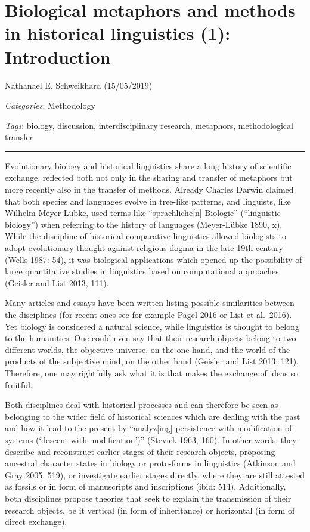 \documentclass[
  a4paper,
  14pt,
  oneside,
  tablecaptionabove
]{scrbook}
\begin{document}
\newpage
\section*{Biological metaphors and methods in
historical linguistics (1): Introduction}

Nathanael E. Schweikhard (15/05/2019)

\emph{Categories}: Methodology

\emph{Tags}: biology, discussion, interdisciplinary research, metaphors,
methodological transfer

\begin{center}\rule{0.5\linewidth}{1pt}\end{center}

Evolutionary biology and historical linguistics share a long history of
scientific exchange, reflected both not only in the sharing and transfer
of metaphors but more recently also in the transfer of methods. Already
Charles Darwin claimed that both species and languages evolve in
tree-like patterns, and linguists, like Wilhelm Meyer-Lübke, used terms
like \enquote{sprachliche{[}n{]} Biologie} (\enquote{linguistic
biology}) when referring to the history of languages (Meyer-Lübke 1890,
x). While the discipline of historical-comparative linguistics allowed
biologists to adopt evolutionary thought against religious dogma in the
late 19th century (Wells 1987: 54), it was biological applications which
opened up the possibility of large quantitative studies in linguistics
based on computational approaches (Geisler and List 2013, 111).

Many articles and essays have been written listing possible similarities
between the disciplines (for recent ones see for example Pagel 2016 or
List et al.~2016). Yet biology is considered a natural science, while
linguistics is thought to belong to the humanities. One could even say
that their research objects belong to two different worlds, the
objective universe, on the one hand, and the world of the products of
the subjective mind, on the other hand (Geisler and List 2013: 121).
Therefore, one may rightfully ask what it is that makes the exchange of
ideas so fruitful.

Both disciplines deal with historical processes and can therefore be
seen as belonging to the wider field of historical sciences which are
dealing with the past and how it lead to the present by
\enquote{analyz{[}ing{]} persistence with modification of systems
(\enquote{descent with modification})} (Stevick 1963, 160). In other
words, they describe and reconstruct earlier stages of their research
objects, proposing ancestral character states in biology or proto-forms
in linguistics (Atkinson and Gray 2005, 519), or investigate earlier
stages directly, where they are still attested as fossils or in form of
manuscripts and inscriptions (ibid: 514). Additionally, both disciplines
propose theories that seek to explain the transmission of their research
objects, be it vertical (in form of inheritance) or horizontal (in form
of direct exchange).
\end{document}
